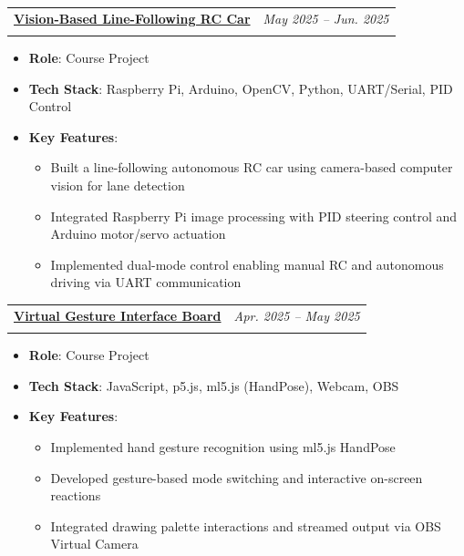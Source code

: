 \documentclass[a4paper,11pt]{article}
\makeatletter
\newcommand{\resumeProject}[4]{%
\item
    \begin{tabularx}{0.98\textwidth}[t]{@{}X>{\raggedleft\arraybackslash}p{4.1cm}@{}}
        \textbf{#1} & \textit{\footnotesize{#3}} \\
        \footnotesize{\textit{#2}} \if\relax\detokenize{#4}\relax\else\newline\footnotesize{#4}\fi &
    \end{tabularx}
}
\newcommand{\resumeItemListStart}{\begin{itemize}}
\newcommand{\resumeItemListEnd}{\end{itemize}}
\makeatother
\begin{document}
\resumeProject
{\href{https://github.com/EliseEgkart/ECS_Autonomous_driving_based_on_computer_vision}{Vision-Based Line-Following RC Car}}
{}
{May 2025 -- Jun. 2025}
{}
\vspace{-1.5em}
\resumeItemListStart
  \item \textbf{Role}: Course Project
  \item \textbf{Tech Stack}: Raspberry Pi, Arduino, OpenCV, Python, UART/Serial, PID Control
  \item \textbf{Key Features}:
  \begin{itemize}[leftmargin=1.2em]
    \item Built a line-following autonomous RC car using camera-based computer vision for lane detection
    \item Integrated Raspberry Pi image processing with PID steering control and Arduino motor/servo actuation
    \item Implemented dual-mode control enabling manual RC and autonomous driving via UART communication
  \end{itemize}
\resumeItemListEnd

\vspace{0.5em}

\resumeProject
{\href{https://github.com/EliseEgkart/ECS_Interactive_Reactions}{Virtual Gesture Interface Board}}
{}
{Apr. 2025 -- May 2025}
{}
\vspace{-1.5em}
\resumeItemListStart
  \item \textbf{Role}: Course Project
  \item \textbf{Tech Stack}: JavaScript, p5.js, ml5.js (HandPose), Webcam, OBS
  \item \textbf{Key Features}:
  \begin{itemize}[leftmargin=1.2em]
    \item Implemented hand gesture recognition using ml5.js HandPose
    \item Developed gesture-based mode switching and interactive on-screen reactions
    \item Integrated drawing palette interactions and streamed output via OBS Virtual Camera
  \end{itemize}
\resumeItemListEnd

\vspace{0.5em}
\end{document}
